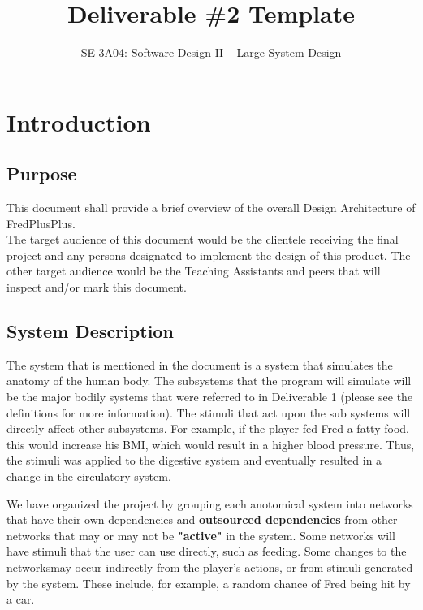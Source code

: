 \documentclass[]{article}
\title{Deliverable \#2 Template}
\author{SE 3A04: Software Design II -- Large System Design}
\date{}
\begin{document}
\maketitle	

\section{Introduction}
\label{sec:introduction}


\subsection{Purpose}
\label{sub:purpose}

This document shall provide a brief overview of the overall Design Architecture
of FredPlusPlus.\\

The target audience of this document would be the clientele receiving the final
project and any persons designated to implement the design of this product. The
other target audience would be the Teaching Assistants and peers that will
inspect and/or mark this document.

\subsection{System Description}
\label{sub:system_description}

The system that is mentioned in the document is a system that simulates the anatomy
of the human body. The subsystems that the program will simulate will be the major
bodily systems that were referred to in Deliverable 1 (please see the definitions for
more information). The stimuli that act upon the sub systems will directly affect
other subsystems. For example, if the player fed Fred a fatty food, this would
increase his BMI, which would result in a higher blood pressure. Thus, the stimuli was
applied to the digestive system and eventually resulted in a change in the circulatory
system.
	
We have organized the project by grouping each anotomical system into networks that have
their own dependencies and \textbf{outsourced dependencies} from other networks
that may or may not be \textbf{"active"} in the system. Some networks will have stimuli that
the user can use directly, such as feeding. Some changes to the networksmay occur indirectly
from the player's actions, or from stimuli generated by the system. These include,
for example, a random chance of Fred being hit by a car.
\end{document}
